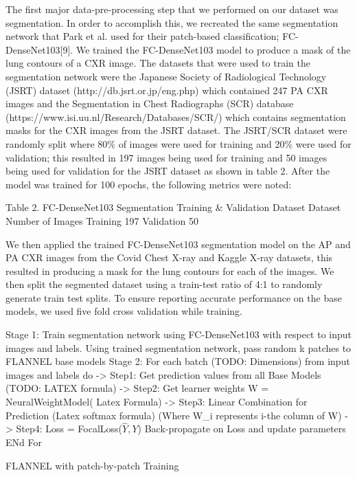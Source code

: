 \documentclass{sigkddExp}
\begin{document}
The first major data-pre-processing step that we performed on our dataset was
segmentation. In order to accomplish this, we recreated the same segmentation
network that Park et al. used for their patch-based classification;
FC-DenseNet103[9]. We trained the FC-DenseNet103 model to produce a mask of the
lung contours of a CXR image. The datasets that were used to train the
segmentation network were the Japanese Society of Radiological Technology (JSRT)
dataset (http://db.jsrt.or.jp/eng.php) which contained 247 PA CXR images and the
Segmentation in Chest Radiographs (SCR) database
(https://www.isi.uu.nl/Research/Databases/SCR/)  which contains segmentation
masks for the CXR images from the JSRT dataset. The JSRT/SCR dataset were
randomly split where 80\% of images were used for training and 20\% were used
for validation; this resulted in 197 images being used for training and 50
images being used for validation for the JSRT dataset as shown in table 2. After
the model was trained for 100 epochs, the following metrics were noted:


Table 2. FC-DenseNet103 Segmentation Training \& Validation Dataset Dataset
Number of Images Training 197 Validation 50


We then applied the trained FC-DenseNet103 segmentation model on the AP and PA
CXR images from the Covid Chest X-ray and Kaggle X-ray datasets, this resulted
in producing a mask for the lung contours for each of the images. We then split
the segmented dataset using a train-test ratio of 4:1 to randomly generate train
test splits. To ensure reporting accurate performance on the base models, we
used five fold cross validation while training.


\begin{algorithm}
    \SetAlgoLined {} 



    Stage 1: Train segmentation network using FC-DenseNet103 with respect to
    input images and labels. Using trained segmentation network, pass random k
    patches to FLANNEL base models Stage 2: For each batch (TODO: Dimensions)
    from input images and labels do -> Step1: Get prediction values from all
    Base Models (TODO: LATEX formula) -> Step2: Get learner weights W =
    NeuralWeightModel( Latex Formula) -> Step3: Linear Combination for
    Prediction (Latex softmax formula) (Where W\_i represents i-the column of W)
    -> Step4: Loss = FocalLoss($\hat{Y} , Y$) Back-propagate on Loss and update
    parameters ENd For
    \caption{FLANNEL with patch-by-patch Training}
\end{algorithm}
\end{document}
